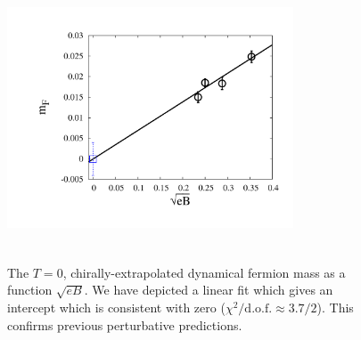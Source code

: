 \documentclass[aps,prd,twocolumn,showpacs,superscriptaddress,groupedaddress]{revtex4}  %
\begin{document}
\begin{figure}
\vspace{-1.2cm}
  \includegraphics[height=8.5cm,width=8.5cm]{ferm_mt_vs_sqrtPHI_linfit_graphene_paper_new.pdf} 
  \vspace{-1.25cm}
\caption{The $T=0$, chirally-extrapolated dynamical fermion mass as a function $\sqrt{eB}$. We have depicted a linear fit which gives an intercept which is consistent with zero ($\chi^2/\text{d.o.f.} \approx 3.7/2$). This confirms previous perturbative predictions.}
\label{fig:MFvsSqrtB}
\end{figure}

\end{document}
